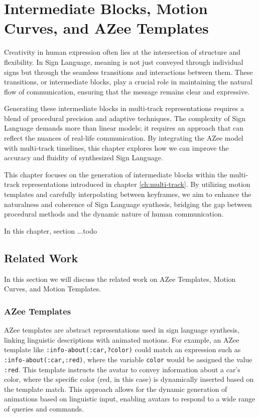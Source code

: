 \documentclass[../../main.tex]{subfiles}
\begin{document}
\chapter{Intermediate Blocks, Motion Curves, and AZee Templates}
\label{ch:intermediate_blocks}

Creativity in human expression often lies at the intersection of structure and flexibility. In Sign Language, meaning is not just conveyed through individual signs but through the seamless transitions and interactions between them. These transitions, or intermediate blocks, play a crucial role in maintaining the natural flow of communication, ensuring that the message remains clear and expressive.

Generating these intermediate blocks in multi-track representations requires a blend of procedural precision and adaptive techniques. The complexity of Sign Language demands more than linear models; it requires an approach that can reflect the nuances of real-life communication. By integrating the AZee model with multi-track timelines, this chapter explores how we can improve the accuracy and fluidity of synthesized Sign Language.

This chapter focuses on the generation of intermediate blocks within the multi-track representations introduced in chapter \ref{ch:multi-track}. By utilizing motion templates and carefully interpolating between keyframes, we aim to enhance the naturalness and coherence of Sign Language synthesis, bridging the gap between procedural methods and the dynamic nature of human communication.

In this chapter, section ...todo

\section{Related Work}
\label{ch:intermediate_blocks:related_work}

In this section we will discuss the related work on AZee Templates, Motion Curves, and Motion Templates. 

\subsection{AZee Templates}
\label{ch:intermediate_blocks:related_work:azee_templates}

AZee templates are abstract representations used in sign language synthesis, linking linguistic descriptions with animated motions. For example, an AZee template like \texttt{:info-about(:car,?color)} could match an expression such as \texttt{:info-about(:car,:red)}, where the variable \texttt{color} would be assigned the value \texttt{:red}. This template instructs the avatar to convey information about a car's color, where the specific color (red, in this case) is dynamically inserted based on the template match. This approach allows for the dynamic generation of animations based on linguistic input, enabling avatars to respond to a wide range of queries and commands.
\end{document}
